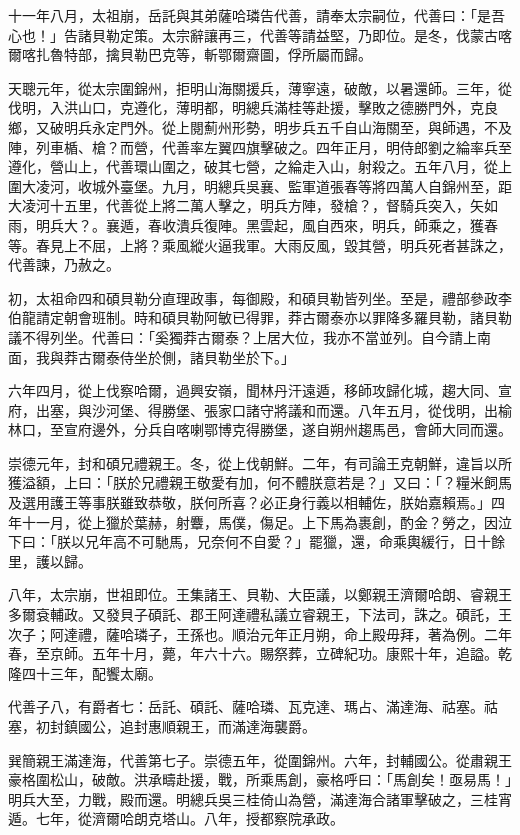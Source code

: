 \begin{pinyinscope}
十一年八月，太祖崩，岳託與其弟薩哈璘告代善，請奉太宗嗣位，代善曰：「是吾心也！」告諸貝勒定策。太宗辭讓再三，代善等請益堅，乃即位。是冬，伐蒙古喀爾喀扎魯特部，擒貝勒巴克等，斬鄂爾齋圖，俘所屬而歸。

天聰元年，從太宗圍錦州，拒明山海關援兵，薄寧遠，破敵，以暑還師。三年，從伐明，入洪山口，克遵化，薄明都，明總兵滿桂等赴援，擊敗之德勝門外，克良鄉，又破明兵永定門外。從上閱薊州形勢，明步兵五千自山海關至，與師遇，不及陣，列車楯、槍？而營，代善率左翼四旗擊破之。四年正月，明侍郎劉之綸率兵至遵化，營山上，代善環山圍之，破其七營，之綸走入山，射殺之。五年八月，從上圍大凌河，收城外臺堡。九月，明總兵吳襄、監軍道張春等將四萬人自錦州至，距大凌河十五里，代善從上將二萬人擊之，明兵方陣，發槍？，督騎兵突入，矢如雨，明兵大？。襄遁，春收潰兵復陣。黑雲起，風自西來，明兵，師乘之，獲春等。春見上不屈，上將？乘風縱火逼我軍。大雨反風，毀其營，明兵死者甚誅之，代善諫，乃赦之。

初，太祖命四和碩貝勒分直理政事，每御殿，和碩貝勒皆列坐。至是，禮部參政李伯龍請定朝會班制。時和碩貝勒阿敏已得罪，莽古爾泰亦以罪降多羅貝勒，諸貝勒議不得列坐。代善曰：「奚獨莽古爾泰？上居大位，我亦不當並列。自今請上南面，我與莽古爾泰侍坐於側，諸貝勒坐於下。」

六年四月，從上伐察哈爾，過興安嶺，聞林丹汗遠遁，移師攻歸化城，趨大同、宣府，出塞，與沙河堡、得勝堡、張家口諸守將議和而還。八年五月，從伐明，出榆林口，至宣府邊外，分兵自喀喇鄂博克得勝堡，遂自朔州趨馬邑，會師大同而還。

崇德元年，封和碩兄禮親王。冬，從上伐朝鮮。二年，有司論王克朝鮮，違旨以所獲溢額，上曰：「朕於兄禮親王敬愛有加，何不體朕意若是？」又曰：「？糧米飼馬及選用護王等事朕雖致恭敬，朕何所喜？必正身行義以相輔佐，朕始嘉賴焉。」四年十一月，從上獵於葉赫，射麞，馬僕，傷足。上下馬為裹創，酌金？勞之，因泣下曰：「朕以兄年高不可馳馬，兄奈何不自愛？」罷獵，還，命乘輿緩行，日十餘里，護以歸。

八年，太宗崩，世祖即位。王集諸王、貝勒、大臣議，以鄭親王濟爾哈朗、睿親王多爾袞輔政。又發貝子碩託、郡王阿達禮私議立睿親王，下法司，誅之。碩託，王次子；阿達禮，薩哈璘子，王孫也。順治元年正月朔，命上殿毋拜，著為例。二年春，至京師。五年十月，薨，年六十六。賜祭葬，立碑紀功。康熙十年，追謚。乾隆四十三年，配饗太廟。

代善子八，有爵者七：岳託、碩託、薩哈璘、瓦克達、瑪占、滿達海、祜塞。祜塞，初封鎮國公，追封惠順親王，而滿達海襲爵。

巽簡親王滿達海，代善第七子。崇德五年，從圍錦州。六年，封輔國公。從肅親王豪格圍松山，破敵。洪承疇赴援，戰，所乘馬創，豪格呼曰：「馬創矣！亟易馬！」明兵大至，力戰，殿而還。明總兵吳三桂倚山為營，滿達海合諸軍擊破之，三桂宵遁。七年，從濟爾哈朗克塔山。八年，授都察院承政。


\end{pinyinscope}
